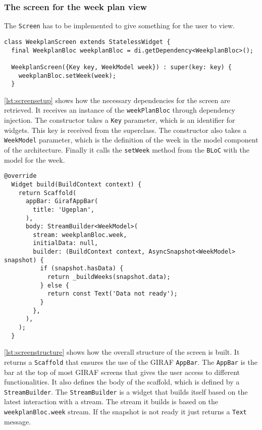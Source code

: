 \subsubsection{The screen for the week plan view}
The \texttt{Screen} has to be implemented to give something for the user to view.
\begin{lstlisting}[caption={Setting up the screen},label={lst:screensetup}]
class WeekplanScreen extends StatelessWidget {
  final WeekplanBloc weekplanBloc = di.getDependency<WeekplanBloc>();

  WeekplanScreen({Key key, WeekModel week}) : super(key: key) {
    weekplanBloc.setWeek(week);
  }
\end{lstlisting}
\autoref{lst:screensetup} shows how the necessary dependencies for the screen are retrieved. 
It receives an instance of the \texttt{weekPlanBloc} through dependency injection.
The constructor takes a \texttt{Key} parameter, which is an identifier for widgets.
This key is received from the superclass.
The constructor also takes a \texttt{WeekModel} parameter, which is the definition of the week in the model component of the architecture. 
Finally it calls the \texttt{setWeek} method from the \texttt{BLoC} with the model for the week.

\begin{lstlisting}[caption={Building the structure},label={lst:screenstructure}]
  @override
  Widget build(BuildContext context) {
    return Scaffold(
      appBar: GirafAppBar(
        title: 'Ugeplan',
      ),
      body: StreamBuilder<WeekModel>(
        stream: weekplanBloc.week,
        initialData: null,
        builder: (BuildContext context, AsyncSnapshot<WeekModel> snapshot) {
          if (snapshot.hasData) {
            return _buildWeeks(snapshot.data);
          } else {
            return const Text('Data not ready');
          }
        },
      ),
    );
  }
\end{lstlisting}
\autoref{lst:screenstructure} shows how the overall structure of the screen is built. 
It returns a \texttt{Scaffold} that ensures the use of the GIRAF \texttt{AppBar}.
The \texttt{AppBar} is the bar at the top of most GIRAF screens that gives the user access to different functionalities.
It also defines the body of the scaffold, which is defined by a \texttt{StreamBuilder}.
The \texttt{StreamBuilder} is a widget that builds itself based on the latest interaction with a stream. 
The stream it builds is based on the \texttt{weekplanBloc.week} stream.
If the snapshot is not ready it just returns a \texttt{Text} message.

